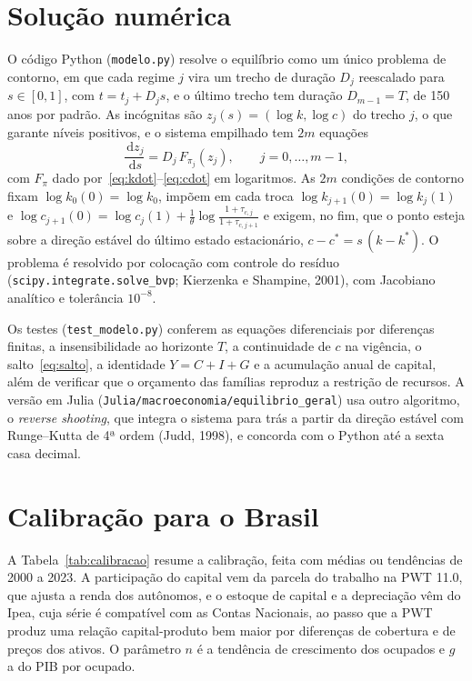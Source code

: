 \documentclass[11pt,a4paper]{article}
\newcommand{\dd}{\,\mathrm{d}}
\begin{document}
\section{Solução numérica}
\label{sec:numerico}

O código Python (\texttt{modelo.py}) resolve o equilíbrio como um único
problema de contorno, em que cada regime $j$ vira um trecho de duração $D_j$
reescalado para $s\in[0,1]$, com $t=t_j+D_js$, e o último trecho tem duração
$D_{m-1}=T$, de 150 anos por padrão. As incógnitas são $z_j(s)=(\log k,\log c)$
do trecho $j$, o que garante níveis positivos, e o sistema empilhado tem $2m$
equações
\[
 \frac{\dd z_j}{\dd s}=D_j\,F_{\pi_j}(z_j),\qquad j=0,\dots,m-1,
\]
com $F_\pi$ dado por~\eqref{eq:kdot}--\eqref{eq:cdot} em logaritmos. As $2m$
condições de contorno fixam $\log k_0(0)=\log k_0$, impõem em cada troca
$\log k_{j+1}(0)=\log k_j(1)$ e
$\log c_{j+1}(0)=\log c_j(1)+\frac1\theta\log\frac{1+\tau_{c,j}}{1+\tau_{c,j+1}}$
e exigem, no fim, que o ponto esteja sobre a direção estável do último estado
estacionário, $c-c^*=s\,(k-k^*)$. O problema é resolvido por colocação com
controle do resíduo (\texttt{scipy.integrate.solve\_bvp}; Kierzenka e
Shampine, 2001), com Jacobiano analítico e tolerância $10^{-8}$.

Os testes (\texttt{test\_modelo.py}) conferem as equações diferenciais por
diferenças finitas, a insensibilidade ao horizonte $T$, a continuidade de $c$
na vigência, o salto~\eqref{eq:salto}, a identidade $Y=C+I+G$ e a acumulação
anual de capital, além de verificar que o orçamento das famílias reproduz a
restrição de recursos. A versão em Julia
(\nolinkurl{Julia/macroeconomia/equilibrio_geral}) usa outro algoritmo, o
\emph{reverse shooting}, que integra o sistema para trás a partir da direção
estável com Runge--Kutta de 4ª ordem (Judd, 1998), e concorda com o Python até
a sexta casa decimal.

\section{Calibração para o Brasil}
\label{sec:calibracao}

A Tabela~\ref{tab:calibracao} resume a calibração, feita com médias ou
tendências de 2000 a 2023. A participação do capital vem da parcela do
trabalho na PWT 11.0, que ajusta a renda dos autônomos, e o estoque de capital
e a depreciação vêm do Ipea, cuja série é compatível com as Contas Nacionais,
ao passo que a PWT produz uma relação capital-produto bem maior por diferenças
de cobertura e de preços dos ativos. O parâmetro $n$ é a tendência de
crescimento dos ocupados e $g$ a do PIB por ocupado.
\end{document}
